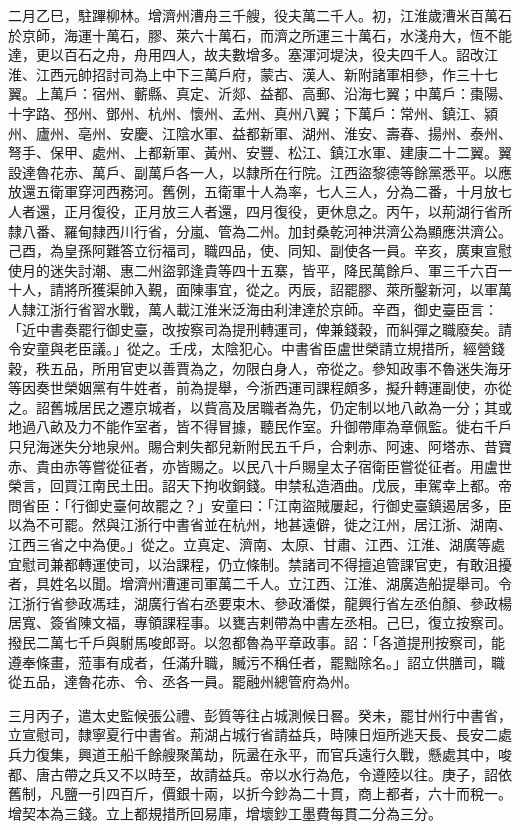 \begin{pinyinscope}
 二月乙巳，駐蹕柳林。增濟州漕舟三千艘，役夫萬二千人。初，江淮歲漕米百萬石於京師，海運十萬石，膠、萊六十萬石，而濟之所運三十萬石，水淺舟大，恆不能達，更以百石之舟，舟用四人，故夫數增多。塞渾河堤決，役夫四千人。詔改江淮、江西元帥招討司為上中下三萬戶府，蒙古、漢人、新附諸軍相參，作三十七翼。上萬戶：宿州、蘄縣、真定、沂郯、益都、高郵、沿海七翼；中萬戶：棗陽、十字路、邳州、鄧州、杭州、懷州、孟州、真州八翼；下萬戶：常州、鎮江、潁州、廬州、亳州、安慶、江陰水軍、益都新軍、湖州、淮安、壽春、揚州、泰州、弩手、保甲、處州、上都新軍、黃州、安豐、松江、鎮江水軍、建康二十二翼。翼設達魯花赤、萬戶、副萬戶各一人，以隸所在行院。江西盜黎德等餘黨悉平。以應放還五衛軍穿河西務河。舊例，五衛軍十人為率，七人三人，分為二番，十月放七人者還，正月復役，正月放三人者還，四月復役，更休息之。丙午，以荊湖行省所隸八番、羅甸隸西川行省，分嵐、管為二州。加封桑乾河神洪濟公為顯應洪濟公。己酉，為皇孫阿難答立衍福司，職四品，使、同知、副使各一員。辛亥，廣東宣慰使月的迷失討潮、惠二州盜郭逢貴等四十五寨，皆平，降民萬餘戶、軍三千六百一十人，請將所獲渠帥入覲，面陳事宜，從之。丙辰，詔罷膠、萊所鑿新河，以軍萬人隸江浙行省習水戰，萬人載江淮米泛海由利津達於京師。辛酉，御史臺臣言：「近中書奏罷行御史臺，改按察司為提刑轉運司，俾兼錢穀，而糾彈之職廢矣。請令安童與老臣議。」從之。壬戌，太陰犯心。中書省臣盧世榮請立規措所，經營錢穀，秩五品，所用官吏以善賈為之，勿限白身人，帝從之。參知政事不魯迷失海牙等因奏世榮姻黨有牛姓者，前為提舉，今浙西運司課程頗多，擬升轉運副使，亦從之。詔舊城居民之遷京城者，以貲高及居職者為先，仍定制以地八畝為一分；其或地過八畝及力不能作室者，皆不得冒據，聽民作室。升御帶庫為章佩監。徙右千戶只兒海迷失分地泉州。賜合剌失都兒新附民五千戶，合剌赤、阿速、阿塔赤、昔寶赤、貴由赤等嘗從征者，亦皆賜之。以民八十戶賜皇太子宿衛臣嘗從征者。用盧世榮言，回買江南民土田。詔天下拘收銅錢。申禁私造酒曲。戊辰，車駕幸上都。帝問省臣：「行御史臺何故罷之？」安童曰：「江南盜賊屢起，行御史臺鎮遏居多，臣以為不可罷。然與江浙行中書省並在杭州，地甚遠僻，徙之江州，居江浙、湖南、江西三省之中為便。」從之。立真定、濟南、太原、甘肅、江西、江淮、湖廣等處宜慰司兼都轉運使司，以治課程，仍立條制。禁諸司不得擅追管課官吏，有敢沮擾者，具姓名以聞。增濟州漕運司軍萬二千人。立江西、江淮、湖廣造船提舉司。令江浙行省參政馮珪，湖廣行省右丞要束木、參政潘傑，龍興行省左丞伯顏、參政楊居寬、簽省陳文福，專領課程事。以甕吉剌帶為中書左丞相。己巳，復立按察司。撥民二萬七千戶與駙馬唆郎哥。以忽都魯為平章政事。詔：「各道提刑按察司，能遵奉條畫，蒞事有成者，任滿升職，贓污不稱任者，罷黜除名。」詔立供膳司，職從五品，達魯花赤、令、丞各一員。罷融州總管府為州。



 三月丙子，遣太史監候張公禮、彭質等往占城測候日晷。癸未，罷甘州行中書省，立宣慰司，隸寧夏行中書省。荊湖占城行省請益兵，時陳日烜所逃天長、長安二處兵力復集，興道王船千餘艘聚萬劫，阮盝在永平，而官兵遠行久戰，懸處其中，唆都、唐古帶之兵又不以時至，故請益兵。帝以水行為危，令遵陸以往。庚子，詔依舊制，凡鹽一引四百斤，價銀十兩，以折今鈔為二十貫，商上都者，六十而稅一。增契本為三錢。立上都規措所回易庫，增壞鈔工墨費每貫二分為三分。




\end{pinyinscope}
